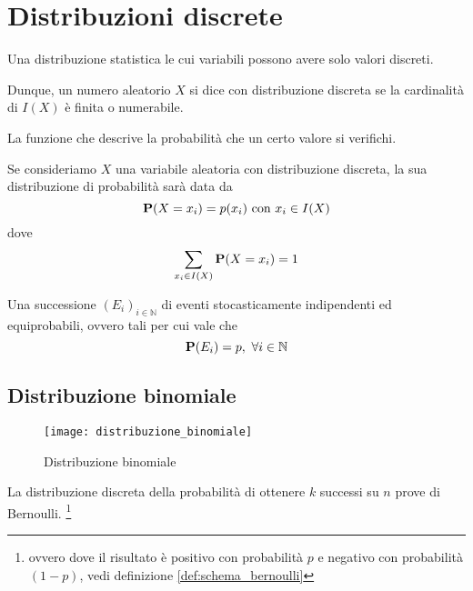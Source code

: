 \chapter{Distribuzioni discrete}
\begin{definition}\label{def:distribuzione_discreta}
  Una distribuzione statistica le cui variabili possono avere solo valori discreti.

  Dunque, un numero aleatorio $X$ si dice con distribuzione discreta se la cardinalità di $I(X)$ è finita o numerabile.
\end{definition}
\begin{definition}\label{def:distribuzione_di_probabilita}
  La funzione che descrive la probabilità che un certo valore si verifichi.

  Se consideriamo $X$ una variabile aleatoria con distribuzione discreta, la sua distribuzione di probabilità sarà data da
  \[ \mathbf{P}(X = x_i) = p(x_i) \text{ con } x_i \in I(X) \]
  dove
  \[ \sum_{x_i \in I(X)} \mathbf{P}(X = x_i) = 1 \]
\end{definition}

\begin{definition}\label{def:schema_bernoulli}
  Una successione \( (E_i)_{i \in \mathbb{N}} \) di eventi stocasticamente indipendenti ed equiprobabili, ovvero tali per cui vale che
  \[ \mathbf{P}(E_i) = p, ~ \forall i \in \mathbb{N} \]
\end{definition}

\section{Distribuzione binomiale} %
\begin{figure*}
  \texttt{[image: distribuzione\_binomiale]}
  \caption{Distribuzione binomiale}
\end{figure*}

\begin{definition}
  \label{def:distribuzione_binomiale}
  La distribuzione discreta della probabilità di ottenere $k$ successi su $n$ prove di Bernoulli.
  \footnote{ovvero dove il risultato è positivo con probabilità $p$ e negativo con probabilità \( (1-p) \), vedi definizione \ref{def:schema_bernoulli}}
\end{definition}

